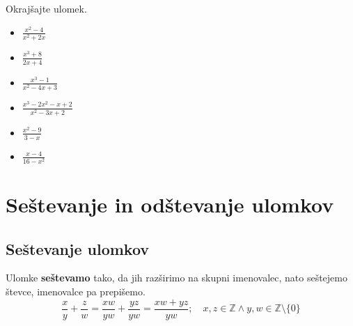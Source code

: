         
            \begin{naloga}
                Okrajšajte ulomek.
                \begin{itemize}
                            \item $\frac{x^2-4}{x^2+2x}$ 
                            \item $\frac{x^3+8}{2x+4}$ 
                            \item $\frac{x^3-1}{x^2-4x+3}$ 
                            \item $\frac{x^3-2x^2-x+2}{x^2-3x+2}$ 
                            \item $\frac{x^2-9}{3-x}$ 
                            \item $\frac{x-4}{16-x^2}$ 
                \end{itemize}
            \end{naloga}
        




        \newpage

        \section{Seštevanje in odštevanje ulomkov}

        
            \subsection*{Seštevanje ulomkov}
                Ulomke \textbf{seštevamo} tako, da jih razširimo na skupni imenovalec, nato seštejemo števce, imenovalce pa prepišemo.
                $$\dfrac{x}{y}+\dfrac{z}{w}=\dfrac{xw}{yw}+\dfrac{yz}{yw}=\dfrac{xw+yz}{yw}; \quad x,z\in\mathbb{Z}\land y,w\in\mathbb{Z}\setminus\{0\} $$
            

